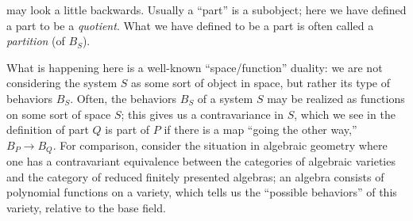 \begin{rmk}
 may look a little backwards. Usually a ``part'' is a subobject; here we have defined a part to be a \emph{quotient}. What we have defined to be a part is often called a \emph{partition} (of $B_S$). 

What is happening here is a well-known ``space/function'' duality: we are not considering the system $S$ as some sort of object in space, but rather its type of behaviors $B_S$. Often, the behaviors $B_S$ of a system $S$ may be realized as functions on some sort of space $S$; this gives us a contravariance in $S$, which we see in the definition of part $Q$ is part of $P$ if there is a map ``going the other way,'' $B_P\to B_Q$. For comparison, consider the situation in algebraic geometry where one has a contravariant equivalence between the categories of algebraic varieties and the category of reduced finitely presented algebras; an algebra consists of polynomial functions on a variety, which tells us the ``possible behaviors'' of this variety, relative to the base field.
\end{rmk}

